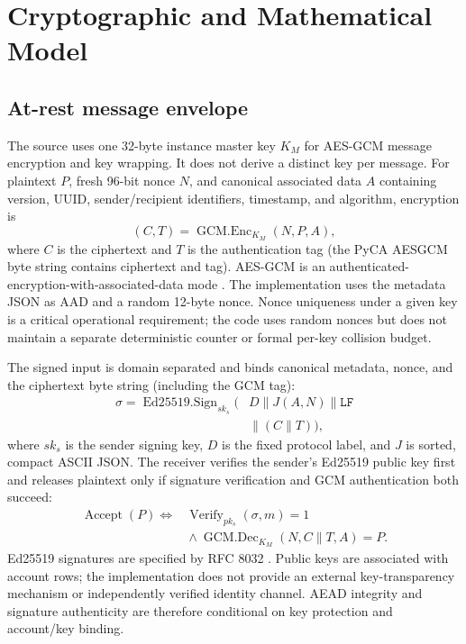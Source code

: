\documentclass[conference]{IEEEtran}
\begin{document}
\section{Cryptographic and Mathematical Model}
\subsection{At-rest message envelope}
The source uses one 32-byte instance master key $K_M$ for AES-GCM message encryption and key wrapping. It does not derive a distinct key per message. For plaintext $P$, fresh 96-bit nonce $N$, and canonical associated data $A$ containing version, UUID, sender/recipient identifiers, timestamp, and algorithm, encryption is
\begin{equation}
(C,T)=\operatorname{GCM.Enc}_{K_M}(N,P,A),
\label{eq:gcm}
\end{equation}
where $C$ is the ciphertext and $T$ is the authentication tag (the PyCA AESGCM byte string contains ciphertext and tag). AES-GCM is an authenticated-encryption-with-associated-data mode \cite{nistgcm,pyca}. The implementation uses the metadata JSON as AAD and a random 12-byte nonce. Nonce uniqueness under a given key is a critical operational requirement; the code uses random nonces but does not maintain a separate deterministic counter or formal per-key collision budget.

The signed input is domain separated and binds canonical metadata, nonce, and the ciphertext byte string (including the GCM tag):
\begin{equation}
\begin{aligned}
\sigma=\operatorname{Ed25519.Sign}_{sk_s}(&D\parallel J(A,N)\parallel\texttt{LF}\\
&\parallel(C\parallel T)),
\end{aligned}
\label{eq:sign}
\end{equation}
where $sk_s$ is the sender signing key, $D$ is the fixed protocol label, and $J$ is sorted, compact ASCII JSON. The receiver verifies the sender's Ed25519 public key first and releases plaintext only if signature verification and GCM authentication both succeed:
\begin{equation}
\begin{aligned}
\operatorname{Accept}(P)\iff{}&\operatorname{Verify}_{pk_s}(\sigma,m)=1\\
&{}\land\operatorname{GCM.Dec}_{K_M}(N,C\parallel T,A)=P.
\end{aligned}
\label{eq:accept}
\end{equation}
Ed25519 signatures are specified by RFC 8032 \cite{rfc8032}. Public keys are associated with account rows; the implementation does not provide an external key-transparency mechanism or independently verified identity channel. AEAD integrity and signature authenticity are therefore conditional on key protection and account/key binding.
\end{document}
